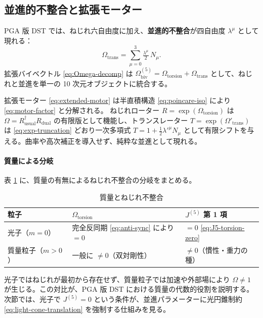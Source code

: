 \documentclass[dvipdfmx,a4paper,oneside]{jsbook}
\numberwithin{equation}{chapter}
\begin{document}
\subsection{並進的不整合と拡張モーター}

PGA 版 DST では、ねじれ六自由度に加え、\textbf{並進的不整合}が四自由度 \(\lambda^\mu\) として現れる：
\begin{equation}
  \Omega_{\mathrm{trans}} = \sum_{\mu=0}^{3} \tfrac{\lambda^\mu}{2}\, N_\mu.
  \label{eq:Omega-trans-only}
\end{equation}
拡張バイベクトル \eqref{eq:Omega-decomp} は \(\Omega_{\mathrm{biv}}^{(5)} = \Omega_{\mathrm{torsion}} + \Omega_{\mathrm{trans}}\) として、ねじれと並進を単一の 10 次元オブジェクトに統合する。

拡張モーター \eqref{eq:extended-motor} は半直積構造 \eqref{eq:poincare-iso} により \eqref{eq:motor-factor} と分解される。
ねじれローター \(R = \exp(\Omega_{\mathrm{torsion}})\) は \(\Omega = R_{\mathrm{usual}}^\dagger R_{\mathrm{dual}}\) の有限版として機能し、トランスレーター \(T = \exp(\Omega'_{\mathrm{trans}})\) は \eqref{eq:exp-truncation} どおり一次多項式 \(T = 1 + \tfrac{1}{2}\lambda'^{\mu} N_\mu\) として有限シフトを与える。曲率や高次補正を導入せず、純粋な並進として現れる。

\paragraph{質量による分岐}
表 \ref{tab:torsion-mass} に、質量の有無によるねじれ不整合の分岐をまとめる。

\begin{table}[htbp]
  \centering
  \caption{質量とねじれ不整合}
  \label{tab:torsion-mass}
  \begin{tabular}{@{}lll@{}}
    \toprule
    粒子 & \(\Omega_{\mathrm{torsion}}\) & \(J^{(5)}\) 第 1 項 \\
    \midrule
    光子（\(m = 0\)） & 完全反同期 \eqref{eq:anti-sync} により \(= 0\) & \(= 0\) \eqref{eq:J5-torsion-zero} \\
    質量粒子（\(m > 0\)） & 一般に \(\neq 0\)（双対剛性） & \(\neq 0\)（慣性・重力の種） \\
    \bottomrule
  \end{tabular}
\end{table}

光子ではねじれが最初から存在せず、質量粒子では加速や外部場により \(\Omega \neq 1\) が生じる。この対比が、PGA 版 DST における質量の代数的役割を説明する。
次節では、光子で \(J^{(5)} = 0\) という条件が、並進パラメーターに光円錐制約 \eqref{eq:light-cone-translation} を強制する仕組みを見る。
\end{document}
